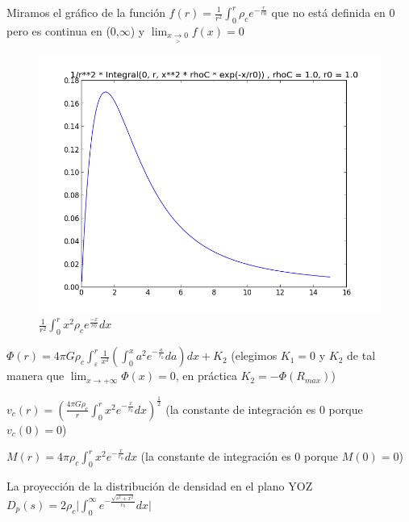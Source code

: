 \documentclass[12pt]{book}
\begin{document}
\begin{description}
\item Miramos el gráfico de la función $f(r) = \frac{1}{r^2}  \int_0^r{\rho_c  e^{-\frac{r}{r0}}}$
que no está definida en 0 pero es continua en (0,$\infty$) y $  \lim_{x \underset{>}{\to} 0} f(x) = 0$
\begin{figure}[!ht]
 \centering
 \includegraphics[scale=0.33]{func2Plot.png}
 \caption{\emph{$\frac{1}{r^2}\int_0^r{x^2  \rho_c  e^{\frac{-x}{r0}}dx}   $}}
\end{figure}
\item $\Phi(r) = 4 \pi G \rho_c \int_\varepsilon^r{ \frac{1}{x^2}(\int_0^x{a^2 e^{-\frac{a}{r_0}}da})dx} + K_2$
(elegimos $K_1 = 0$ y $K_2$  de tal manera que $\lim_{x \to +\infty}\Phi(x) = 0 $, en práctica $K_2 = -\Phi(R_{max})$)
\item $v_c(r) = (\frac{4 \pi G \rho_c}{r}\int_0^r{x^2 e^{-\frac{x}{r_0}}dx} )^{\frac{1}{2}}  $ (la constante de integración es 0 porque $v_c(0) = 0$)
\item $M(r) = 4 \pi \rho_c \int_0^r{x^2 e^{-\frac{x}{r_0}}dx}$ (la constante de integración es 0 porque $M(0) = 0$) 
\item La proyección de la distribución de densidad en el plano YOZ
$D_p(s) = 2 \rho_c \lvert \int_0^\infty{e^{-\frac{\sqrt{s^2 + x^2}}{r_0}} dx}  \rvert$




\end{description}
\end{document}
